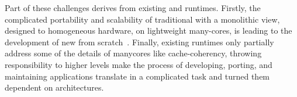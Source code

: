     Part of these challenges derives from existing \oses and runtimes.
    Firstly, the complicated portability and scalability of traditional \oses with a monolithic view, designed to homogeneous hardware, on lightweight many-cores, is leading to the development of new \oses from scratch~\cite{Baumann2009, kluge2014, nightingale2009, rhoden2011}.
    Finally, existing runtimes only partially address some of the details of manycores like cache-coherency, throwing responsibility to higher levels make the process of developing, porting, and maintaining applications translate in a complicated task and turned them dependent on architectures.




